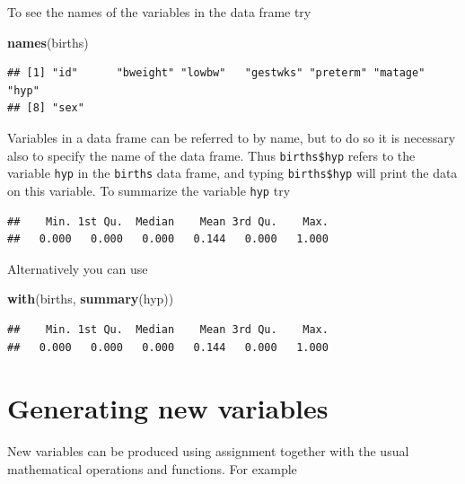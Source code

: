 \documentclass[
]{book}
\newenvironment{Shaded}{\begin{snugshade}}{\end{snugshade}}
\newcommand{\FunctionTok}[1]{\textcolor[rgb]{0.13,0.29,0.53}{\textbf{#1}}}
\newcommand{\NormalTok}[1]{#1}
\newcommand{\SpecialCharTok}[1]{\textcolor[rgb]{0.81,0.36,0.00}{\textbf{#1}}}
\begin{document}
To see the names of the variables in the data frame try

\begin{Shaded}
\begin{Highlighting}[]
\FunctionTok{names}\NormalTok{(births)}
\end{Highlighting}
\end{Shaded}

\begin{verbatim}
## [1] "id"      "bweight" "lowbw"   "gestwks" "preterm" "matage"  "hyp"    
## [8] "sex"
\end{verbatim}

Variables in a data frame can be referred to by name, but to do so
it is necessary also to specify the name of the data frame. Thus
\texttt{births\$hyp} refers to the variable \texttt{hyp} in the \texttt{births}
data frame, and typing \texttt{births\$hyp} will print the data on this
variable. To summarize the variable \texttt{hyp} try

\begin{Shaded}
\end{Shaded}

\begin{verbatim}
##    Min. 1st Qu.  Median    Mean 3rd Qu.    Max. 
##   0.000   0.000   0.000   0.144   0.000   1.000
\end{verbatim}

Alternatively you can use

\begin{Shaded}
\begin{Highlighting}[]
\FunctionTok{with}\NormalTok{(births, }\FunctionTok{summary}\NormalTok{(hyp))}
\end{Highlighting}
\end{Shaded}

\begin{verbatim}
##    Min. 1st Qu.  Median    Mean 3rd Qu.    Max. 
##   0.000   0.000   0.000   0.144   0.000   1.000
\end{verbatim}

\section{Generating new variables}\label{generating-new-variables}

New variables can be produced using assignment together with the usual
mathematical operations and functions. For example
\end{document}

